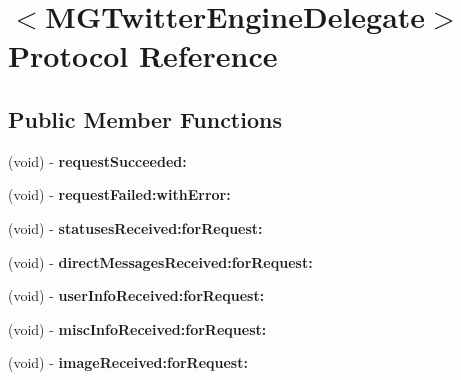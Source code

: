 \hypertarget{protocol_m_g_twitter_engine_delegate-p}{
\section{$<$\-M\-G\-Twitter\-Engine\-Delegate$>$ \-Protocol \-Reference}
\label{protocol_m_g_twitter_engine_delegate-p}
}
\subsection*{\-Public \-Member \-Functions}
\begin{DoxyCompactItemize}
\item 
\hypertarget{protocol_m_g_twitter_engine_delegate-p_ae499edf1ac686037c262aca09b61046e}{
(void) -\/ {\bfseries request\-Succeeded\-:}}
\label{protocol_m_g_twitter_engine_delegate-p_ae499edf1ac686037c262aca09b61046e}

\item 
\hypertarget{protocol_m_g_twitter_engine_delegate-p_a20d36760f8a06587326b9954f6d86fa2}{
(void) -\/ {\bfseries request\-Failed\-:with\-Error\-:}}
\label{protocol_m_g_twitter_engine_delegate-p_a20d36760f8a06587326b9954f6d86fa2}

\item 
\hypertarget{protocol_m_g_twitter_engine_delegate-p_abcc40d8212e9b46222b69828a3eac290}{
(void) -\/ {\bfseries statuses\-Received\-:for\-Request\-:}}
\label{protocol_m_g_twitter_engine_delegate-p_abcc40d8212e9b46222b69828a3eac290}

\item 
\hypertarget{protocol_m_g_twitter_engine_delegate-p_aa8f15a5ab438fc797b28bc9fa51f9bf8}{
(void) -\/ {\bfseries direct\-Messages\-Received\-:for\-Request\-:}}
\label{protocol_m_g_twitter_engine_delegate-p_aa8f15a5ab438fc797b28bc9fa51f9bf8}

\item 
\hypertarget{protocol_m_g_twitter_engine_delegate-p_a5a19f97bdf28e581b0f8d87005aac5ab}{
(void) -\/ {\bfseries user\-Info\-Received\-:for\-Request\-:}}
\label{protocol_m_g_twitter_engine_delegate-p_a5a19f97bdf28e581b0f8d87005aac5ab}

\item 
\hypertarget{protocol_m_g_twitter_engine_delegate-p_a5cadd29987cf71c50ce0cad7370edf1b}{
(void) -\/ {\bfseries misc\-Info\-Received\-:for\-Request\-:}}
\label{protocol_m_g_twitter_engine_delegate-p_a5cadd29987cf71c50ce0cad7370edf1b}

\item 
\hypertarget{protocol_m_g_twitter_engine_delegate-p_a02cb45cd9f04e1cbf9a46d1b973dcdc3}{
(void) -\/ {\bfseries image\-Received\-:for\-Request\-:}}
\label{protocol_m_g_twitter_engine_delegate-p_a02cb45cd9f04e1cbf9a46d1b973dcdc3}


\end{DoxyCompactItemize}
